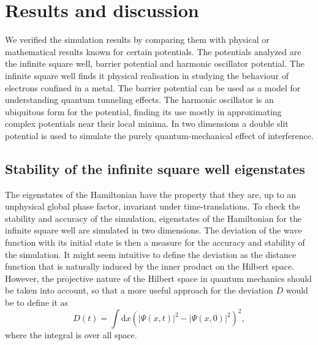 \section*{Results and discussion}
We verified the simulation results by comparing them with physical or mathematical results known for certain potentials. The potentials analyzed are the infinite square well, barrier potential and harmonic oscillator potential.
The infinite square well finds it physical realisation in studying the behaviour of electrons confined in a metal. The barrier potential can be used as a model for understanding quantum tunneling effects. The harmonic oscillator is an ubiquitous form for the potential, finding its use mostly in approximating complex potentials near their local minima.
In two dimensions a double slit potential is used to simulate the purely quantum-mechanical effect of interference.


\subsection*{Stability of the infinite square well eigenstates}
The eigenstates of the Hamiltonian have the property that they are, up to an unphysical global phase factor, invariant under time-translations. To check the stability and accuracy of the simulation, eigenstates of the Hamiltonian for the infinite square well are simulated in two dimensions. The deviation of the wave function with its initial state is then a measure for the accuracy and stability of the simulation. It might seem intuitive to define the deviation as the distance function that is naturally induced by the inner product on the Hilbert space. However, the projective nature of the Hilbert space in quantum mechanics should be taken into account, so that a more useful approach for the deviation $D$ would be to define it as
\[
D(t) = \int\mathrm{d}x\left(|\Psi(x,t)|^2-|\Psi(x,0)|^2\right)^2,
\] where the integral is over all space.

